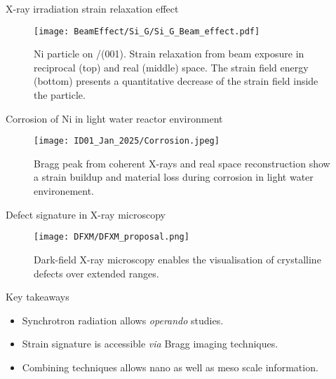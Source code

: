 
\separatorcolumn

\begin{column}{\colwidth}

    \begin{block}{X-ray irradiation strain relaxation effect}
        \begin{figure}
            \centering
            \texttt{[image: BeamEffect/Si\_G/Si\_G\_Beam\_effect.pdf]}
            \caption{Ni particle on /(001).
            Strain relaxation from beam exposure in reciprocal (top) and real (middle) space.
            The strain field energy (bottom) presents a quantitative decrease of the strain field inside the particle.
            }
        \end{figure}
    \end{block}

    \begin{block}{Corrosion of Ni in light water reactor environment}
        \begin{figure}
            \centering
            \texttt{[image: ID01\_Jan\_2025/Corrosion.jpeg]}
            \caption{Bragg peak from coherent X-rays and real space reconstruction show a strain buildup and material loss during corrosion in light water environement.}
        \end{figure}
    \end{block}

    \begin{block}{Defect signature in X-ray microscopy}
        \begin{figure}
            \centering
            \texttt{[image: DFXM/DFXM\_proposal.png]}
            \caption{Dark-field X-ray microscopy enables the visualisation of crystalline defects over extended ranges.}
        \end{figure}
    \end{block}


    \begin{alertblock}{Key takeaways}
        \begin{itemize}
            \setlength\itemsep{1em}
            \item Synchrotron radiation allows \textit{operando} studies.
            \item Strain signature is accessible \textit{via} Bragg imaging techniques.
            \item Combining techniques allows nano as well as meso scale information.
        \end{itemize}


\end{alertblock}
\end{column}

